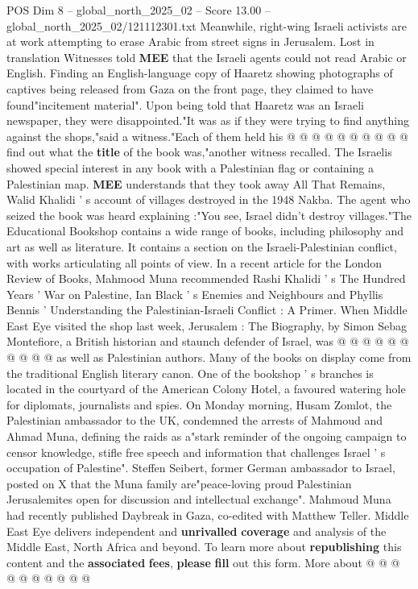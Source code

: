 \begin{textsample}{POS Dim 8 – global\_north\_2025\_02 – Score 13.00 – global\_north\_2025\_02/121112301.txt}
Meanwhile, right-wing Israeli activists are at work attempting to erase Arabic from street signs in Jerusalem.
Lost in translation Witnesses told \textbf{MEE} that the Israeli agents could not read Arabic or English.
Finding an English-language copy of Haaretz showing photographs of captives being released from Gaza on the front page, they claimed to have found"incitement material".
Upon being told that Haaretz was an Israeli newspaper, they were disappointed."It was as if they were trying to find anything against the shops,"said a witness."Each of them held his @ @ @ @ @ @ @ @ @ @ find out what the \textbf{title} of the book was,"another witness recalled.
The Israelis showed special interest in any book with a Palestinian flag or containing a Palestinian map. \textbf{MEE} understands that they took away All That Remains, Walid Khalidi ' s account of villages destroyed in the 1948 Nakba.
The agent who seized the book was heard explaining :"You see, Israel didn't destroy villages."The Educational Bookshop contains a wide range of books, including philosophy and art as well as literature.
It contains a section on the Israeli-Palestinian conflict, with works articulating all points of view.
In a recent article for the London Review of Books, Mahmood Muna recommended Rashi Khalidi ' s The Hundred Years ' War on Palestine, Ian Black ' s Enemies and Neighbours and Phyllis Bennis ' Understanding the Palestinian-Israeli Conflict : A Primer.
When Middle East Eye visited the shop last week, Jerusalem : The Biography, by Simon Sebag Montefiore, a British historian and staunch defender of Israel, was @ @ @ @ @ @ @ @ @ @ as well as Palestinian authors.
Many of the books on display come from the traditional English literary canon.
One of the bookshop ' s branches is located in the courtyard of the American Colony Hotel, a favoured watering hole for diplomats, journalists and spies.
On Monday morning, Husam Zomlot, the Palestinian ambassador to the UK, condemned the arrests of Mahmoud and Ahmad Muna, defining the raids as a"stark reminder of the ongoing campaign to censor knowledge, stifle free speech and information that challenges Israel ' s occupation of Palestine".
Steffen Seibert, former German ambassador to Israel, posted on X that the Muna family are"peace-loving proud Palestinian Jerusalemites open for discussion and intellectual exchange".
Mahmoud Muna had recently published Daybreak in Gaza, co-edited with Matthew Teller.
Middle East Eye delivers independent and \textbf{unrivalled} \textbf{coverage} and analysis of the Middle East, North Africa and beyond.
To learn more about \textbf{republishing} this content and the \textbf{associated} \textbf{fees}, \textbf{please} \textbf{fill} out this form.
More about @ @ @ @ @ @ @ @ @ @

\end{textsample}
